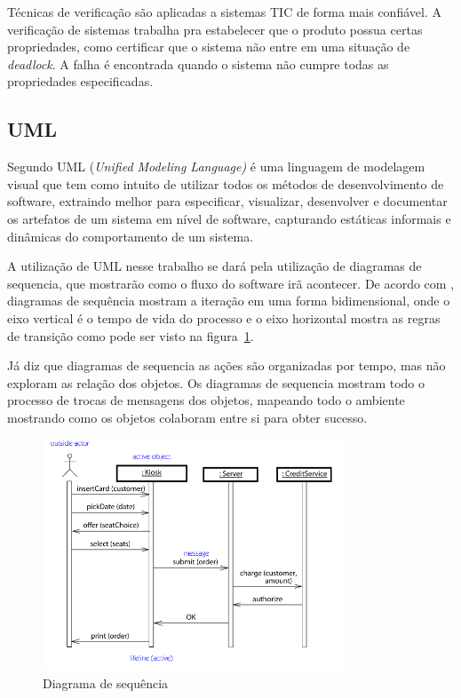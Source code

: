 Técnicas de verificação são aplicadas a sistemas TIC de forma mais confiável. A verificação de sistemas trabalha pra estabelecer que o produto possua certas propriedades, como certificar que o sistema não entre em uma situação de \textit{deadlock}. A falha é encontrada quando o sistema não cumpre todas as propriedades especificadas.



\subsection{UML}
Segundo  UML (\textit{Unified Modeling Language)} é uma linguagem de modelagem visual que tem como intuito de utilizar todos os métodos de desenvolvimento de software, extraindo melhor para especificar, visualizar, desenvolver e documentar os artefatos de um sistema em nível de software, capturando estáticas informais e dinâmicas do comportamento de um sistema.

A utilização de UML nesse trabalho se dará pela utilização de diagramas de sequencia, que mostrarão como o fluxo do software irã acontecer. De acordo com , diagramas de sequência mostram a iteração em uma forma bidimensional, onde o eixo vertical é o tempo de vida do processo e o eixo horizontal mostra as regras de transição como pode ser visto na figura~\ref{fig:sequencerumbaugh}. %

Já  diz que diagramas de sequencia as ações são organizadas por tempo, mas não exploram as relação dos objetos. Os diagramas de sequencia mostram todo o processo de trocas de mensagens dos objetos, mapeando todo o ambiente mostrando como os objetos colaboram entre si para obter sucesso. 
 \begin{figure}[H]
	\centering
    	\caption{\label{fig:sequencerumbaugh} Diagrama de sequência }
		\includegraphics[width = 0.8\textwidth]	{resources/sequencediagramrumbaugh}
\end{figure}




